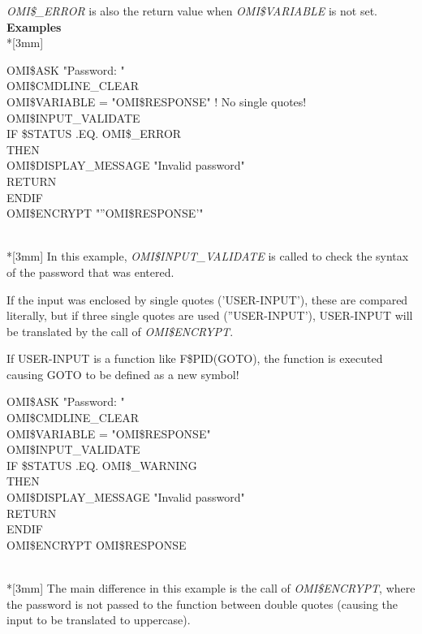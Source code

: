\documentclass[a4paper]{book}
\renewcommand{\indent}{\hspace*{5mm}}
\begin{document}
\textsl{OMI{\$}{\_}ERROR} is also the return value when \textsl{OMI{\$}VARIABLE} is not set.\\[3mm]
\textbf{Examples}\\*[3mm]
\begin{textsf}
\indent{\$} OMI{\$}ASK "Password: " \\
\indent{\$} OMI{\$}CMDLINE{\_}CLEAR \\
\indent{\$} OMI{\$}VARIABLE = "OMI{\$}RESPONSE" ! No single quotes! \\
\indent{\$} OMI{\$}INPUT{\_}VALIDATE \\
\indent{\$} IF {\$}STATUS .EQ. OMI{\$}{\_}ERROR \\
\indent{\$}   THEN \\
\indent{\$}     OMI{\$}DISPLAY{\_}MESSAGE "Invalid password" \\
\indent{\$}     RETURN \\
\indent{\$} ENDIF \\
\indent{\$} OMI{\$}ENCRYPT "''OMI{\$}RESPONSE'" \\
\end{textsf}\\*[3mm]
In this example, \textsl{OMI{\$}INPUT{\_}VALIDATE} is called to check the syntax of 
the password that was entered.

If the input was enclosed by single quotes ('USER-INPUT'), these are compared 
literally, but if three single quotes are used (''USER-INPUT'), USER-INPUT will be 
translated by the call of \textsl{OMI{\$}ENCRYPT}.

If USER-INPUT is a function like F{\$}PID(GOTO), the function is executed causing 
GOTO to be defined as a new symbol!\\[3mm]
\begin{textsf}
\indent{\$} OMI{\$}ASK "Password: " \\
\indent{\$} OMI{\$}CMDLINE{\_}CLEAR \\
\indent{\$} OMI{\$}VARIABLE = "OMI{\$}RESPONSE" \\
\indent{\$} OMI{\$}INPUT{\_}VALIDATE \\
\indent{\$} IF {\$}STATUS .EQ. OMI{\$}{\_}WARNING \\
\indent{\$}   THEN \\
\indent{\$}     OMI{\$}DISPLAY{\_}MESSAGE "Invalid password" \\
\indent{\$}     RETURN \\
\indent{\$} ENDIF \\
\indent{\$} OMI{\$}ENCRYPT OMI{\$}RESPONSE \\
\end{textsf}\\*[3mm]
The main difference in this example is the call of \textsl{OMI{\$}ENCRYPT}, where the 
password is not passed to the function between double quotes (causing the 
input to be translated to uppercase).
\end{document}
